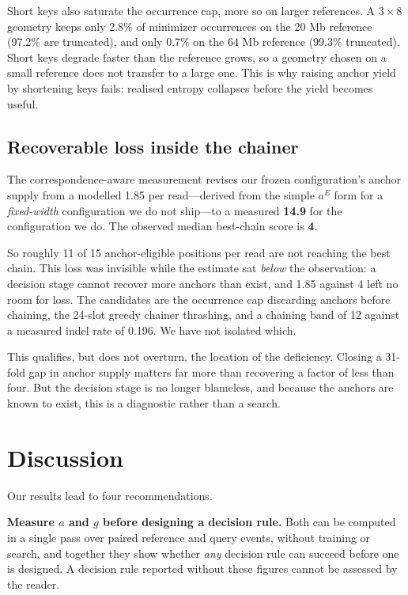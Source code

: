 \documentclass[conference]{IEEEtran}
\begin{document}
Short keys also saturate the occurrence cap, more so on larger references. A $3 \times 8$
geometry keeps only 2.8\% of minimizer occurrences on the 20 Mb reference (97.2\% are
truncated), and only 0.7\% on the 64 Mb reference (99.3\% truncated). Short keys degrade faster than the reference grows, so a
geometry chosen on a small reference does not transfer to a large one. This is why raising
anchor yield by shortening keys fails: realised entropy collapses before the yield becomes
useful.

\subsection{Recoverable loss inside the chainer}

The correspondence-aware measurement revises our frozen configuration's anchor supply from a
modelled 1.85 per read---derived from the simple $a^{E}$ form for a \emph{fixed-width}
configuration we do not ship---to a measured \textbf{14.9} for the configuration we do. The
observed median best-chain score is \textbf{4}.

So roughly 11 of 15 anchor-eligible positions per read are not reaching the best chain. This loss
was invisible while the estimate sat \emph{below} the observation: a decision stage cannot
recover more anchors than exist, and 1.85 against 4 left no room for loss. The candidates are the
occurrence cap discarding anchors before chaining, the 24-slot greedy chainer thrashing, and a
chaining band of 12 against a measured indel rate of 0.196. We have not isolated which.

This qualifies, but does not overturn, the location of the deficiency. Closing a 31-fold gap in
anchor supply matters far more than recovering a factor of less than four. But the decision stage is no longer blameless,
and because the anchors are known to exist, this is a diagnostic rather than a search.

\section{Discussion}
Our results lead to four recommendations.

\textbf{Measure $a$ and $g$ before designing a decision rule.} Both can be computed in a single
pass over paired reference and query events, without training or search, and together they show
whether \emph{any} decision rule can succeed before one is designed. A decision rule reported
without these figures cannot be assessed by the reader.
\end{document}
